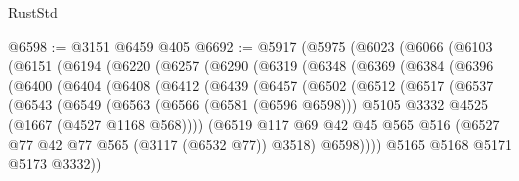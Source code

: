 \begin{lexlean}{RustStd}
\begin{coremodule}
@6598 := @3151 @6459 @405
@6692 := @5917
    (@5975
      (@6023
        (@6066
          (@6103
            (@6151
              (@6194
                (@6220
                  (@6257
                    (@6290
                      (@6319
                        (@6348
                          (@6369
                            (@6384
                              (@6396
                                (@6400
                                  (@6404
                                    (@6408
                                      (@6412
                                        (@6439
                                          (@6457
                                            (@6502
                                              (@6512
                                                (@6517
                                                  (@6537
                                                    (@6543
                                                      (@6549
                                                        (@6563
                                                          (@6566 (@6581 (@6596 @6598)))
                                                          @5105
                                                          @3332
                                                          @4525
                                                          (@1667 (@4527 @1168 @568))))
                                                      (@6519
                                                        @117
                                                        @69
                                                        @42
                                                        @45
                                                        @565
                                                        @516
                                                        (@6527
                                                          @77
                                                          @42
                                                          @77
                                                          @565
                                                          (@3117 (@6532 @77))
                                                          @3518)
                                                        @6598))))
                                                @5165
                                                @5168
                                                @5171
                                                @5173
                                                @3332))

\end{coremodule}
\end{lexlean}

